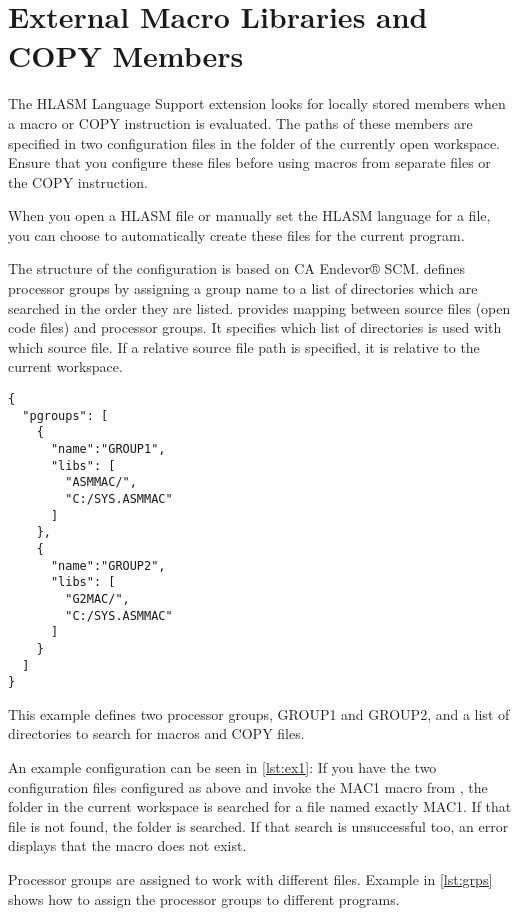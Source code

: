 \section{External Macro Libraries and COPY Members}
\label{sec:configuration}

The HLASM Language Support extension looks for locally stored members when a macro or COPY instruction is evaluated. The paths of these members are specified in two configuration files in the  folder of the currently open workspace. Ensure that you configure these files before using macros from separate files or the COPY instruction.

When you open a HLASM file or manually set the HLASM language for a file, you can choose to automatically create these files for the current program.

The structure of the configuration is based on CA Endevor® SCM.  defines processor groups by assigning a group name to a list of directories which are searched in the order they are listed.  provides mapping between source files (open code files) and processor groups. It specifies which list of directories is used with which source file. If a relative source file path is specified, it is relative to the current workspace.

\begin{listing}
	\begin{verbatim}
{
  "pgroups": [
    {
      "name":"GROUP1",
      "libs": [
        "ASMMAC/",
        "C:/SYS.ASMMAC"
      ]
    },
    {
      "name":"GROUP2",
      "libs": [
        "G2MAC/",
        "C:/SYS.ASMMAC"
      ]
    }
  ]
}
	\end{verbatim}
	\caption{This example defines two processor groups, GROUP1 and GROUP2, and a list of directories to search for macros and COPY files.}
	\label{lst:ex1}
\end{listing}

An example configuration can be seen in \cref{lst:ex1}:
If you have the two configuration files configured as above and invoke the MAC1 macro from , the folder  in the current workspace is searched for a file named exactly MAC1. If that file is not found, the folder  is searched. If that search is unsuccessful too, an error displays that the macro does not exist.

Processor groups are assigned to work with different files. Example in \cref{lst:grps} shows how to assign the processor groups to different programs.

